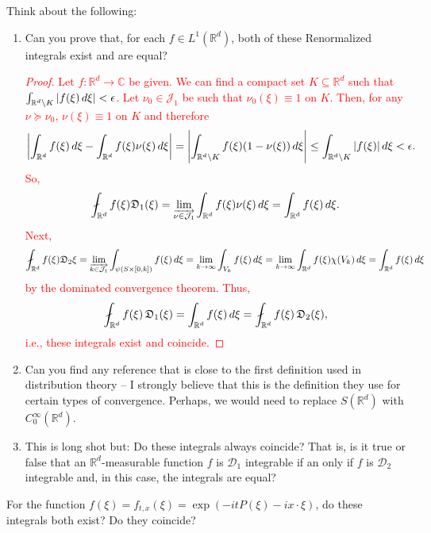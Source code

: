 \documentclass[11pt]{article}
\newcommand\R{\mathbb{R}}
\newcommand{\slantedslash}{\mathbin{\rotatebox[origin=c]{23}{$-$}}}
\newcommand{\rint}{\mathop{\mathpalette\docircint\relax}\!\int}
\newcommand{\docircint}[2]{%
  \ifx#1\displaystyle
    \displayrint
  \else
    \normalrint{#1}%
  \fi
}
\newcommand{\displayrint}{\displaystyle \slantedslash \mkern-18mu}
\newcommand{\normalrint}[1]{%
  \smallerc{#1}\ifx#1\textstyle\mkern-9mu\else\mkern-8.2mu\fi
}
\newcommand{\smallerc}[1]{%
  \vcenter{\hbox{$\ifx#1\textstyle\scriptstyle\else\scriptscriptstyle\fi \slantedslash $}}%
}
\begin{document}
{Think about the following:
\begin{enumerate}
\item Can you prove that, for each $f\in L^1(\mathbb{R}^d)$, both of these Renormalized integrals exist and are equal?
\textcolor{red}{
\begin{proof}
Let $f: \R^d \to \mathbb{C}$ be given. We can find a compact set $K \subseteq \R^d$ such that $\int_{\R^d\setminus K} \abs{f(\xi)\,d\xi} < \epsilon$. Let $\nu_0 \in \mathcal{J}_1$ be such that $\nu_0(\xi) \equiv 1$ on $K$. Then, for any $\nu \succcurlyeq \nu_0$, $\nu(\xi)\equiv 1$ on $K$ and therefore
\begin{equation*}
    \abs{\int_{\R^d}f(\xi)\,d\xi - \int_{\R^d}f(\xi)\nu(\xi)\,d\xi} = \abs{\int_{\R^d\setminus K} f(\xi)(1-\nu(\xi))\,d\xi} \leq \int_{\R^d\setminus K} \abs{f(\xi)}\,d\xi < \epsilon.
\end{equation*}
So,
\begin{equation*}
    \rint_{\mathbb{R}^d} f(\xi)\mathfrak{D}_1(\xi)
    =
    \lim_{{\overrightarrow{\nu\in \mathcal{J}_1}}}\int_{\mathbb{R}^d} f(\xi)\nu(\xi)\,d\xi 
    =
    \int_{\R^d}f(\xi)\,d\xi.
\end{equation*}    
Next, 
\begin{equation*}
        \rint_{\mathbb{R}^d} f(\xi)\mathfrak{D}_2\xi
        =
        \lim_{{\overrightarrow{k\in \mathcal{J}_1}}}\int_{\psi(S\times [0,k])}f(\xi)\,d\xi
        = \lim_{k\to \infty} \int_{V_k} f(\xi)\,d\xi
        = \lim_{k\to \infty} \int_{\R^d} f(\xi)\chi(V_k)\,d\xi
        = \int_{\R^d}f(\xi)\,d\xi
\end{equation*}
by the dominated convergence theorem. Thus,
\begin{equation*}
    \rint_{\R^d} f(\xi)\,\mathfrak{D}_1(\xi) 
    = \int_{\R^d} f(\xi)\,d\xi 
    = \rint_{\R^d} f(\xi)\,\mathfrak{D}_2(\xi),
\end{equation*}
i.e., these integrals exist and coincide.
\end{proof}}
\item Can you find any reference that is close to the first definition used in distribution theory -- I strongly believe that this is the definition they use for certain types of convergence. Perhaps, we would need to replace $S(\mathbb{R}^d)$ with $C_0^\infty(\mathbb{R}^d)$.
\item This is long shot but: Do these integrals always coincide? That is, is it true or false that an $\mathbb{R}^d$-measurable function $f$ is $\mathcal{D}_1$ integrable if an only if $f$ is $\mathcal{D}_2$ integrable and, in this case, the integrals are equal?
\end{enumerate}
For the function $f(\xi)=f_{t,x}(\xi)=\exp(-i t P(\xi)-ix\cdot\xi)$, do these integrals both exist? Do they coincide?}
\end{document}
